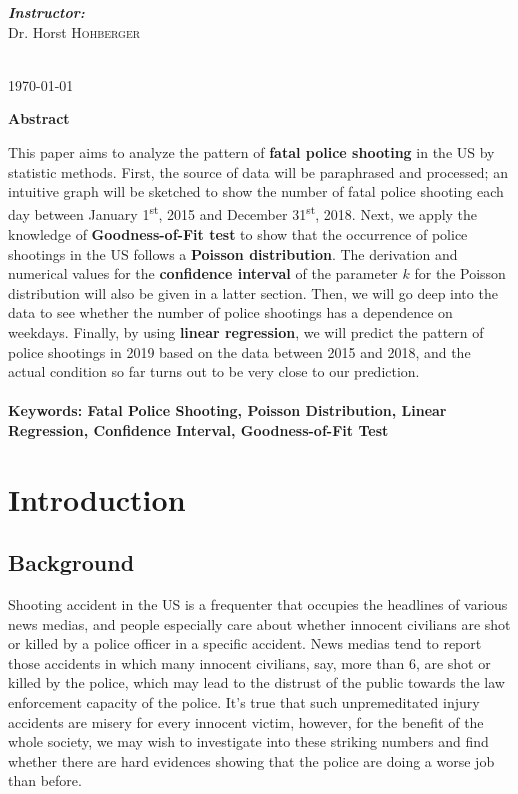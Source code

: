 \documentclass[a4paper]{article}
\begin{document}
{\begin{titlepage}
\begin{center}
\begin{minipage}{0.4\textwidth}
\emph{\textbf{Instructor:}}\\
\Large{Dr. Horst \textsc{Hohberger}}

\end{minipage}\\[1.6cm]
{\large \today}
\end{center}

\end{titlepage}
\newpage

\fontsize{12pt}{\baselineskip}\rm{
\begin{center}
\textbf{{\LARGE Abstract}}
\end{center}
\par{This paper aims to analyze the pattern of \textbf{fatal police shooting} in the US by statistic methods. First, the source of data will be paraphrased and processed; an intuitive graph will be sketched to show the number of fatal police shooting each day between January 1\textsuperscript{st}, 2015 and December 31\textsuperscript{st}, 2018. Next, we apply the knowledge of \textbf{Goodness-of-Fit test} to show that the occurrence of police shootings in the US follows a \textbf{Poisson distribution}. The derivation and numerical values for the \textbf{confidence interval} of the parameter $k$ for the Poisson distribution will also be given in a latter section. Then, we will go deep into the data to see whether the number of police shootings has a dependence on weekdays. Finally, by using \textbf{linear regression}, we will predict the pattern of police shootings in 2019 based on the data between 2015 and 2018, and the actual condition so far turns out to be very close to our prediction.}
\ \\
\ \\
{\small\textbf{Keywords: Fatal Police Shooting, Poisson Distribution, Linear Regression, Confidence Interval, Goodness-of-Fit Test}}

\newpage

\tableofcontents
\newpage

\section{Introduction}
\subsection{Background}
Shooting accident in the US is a frequenter that occupies the headlines of various news medias, and people especially care about whether innocent civilians are shot or killed by a police officer in a specific accident. News medias tend to report those accidents in which many innocent civilians, say, more than 6, are shot or killed by the police, which may lead to the distrust of the public towards the law enforcement capacity of the police. It's true that such unpremeditated injury accidents are misery for every innocent victim, however, for the benefit of the whole society, we may wish to investigate into these striking numbers and find whether there are hard evidences showing that the police are doing a worse job than before.

}}
\end{document}
